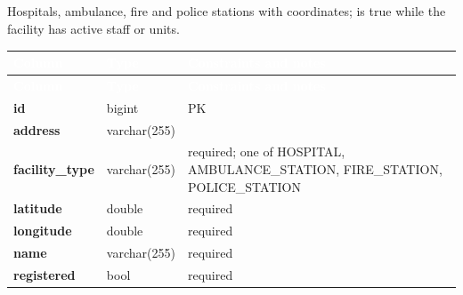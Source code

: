 \subsection*{}
Hospitals, ambulance, fire and police stations with coordinates;  is true while the facility has active staff or units.\par\vspace{2pt}
{\tabfont\rowband
\begin{longtable}{@{}>{\raggedright\arraybackslash}p{}>{\raggedright\arraybackslash}p{}>{\raggedright\arraybackslash}p{}@{}}
\rowcolor{najdanavy}\textcolor{white}{\sffamily\bfseries\small Column} & \textcolor{white}{\sffamily\bfseries\small Type} & \textcolor{white}{\sffamily\bfseries\small Constraints and notes}\\
\endfirsthead
\rowcolor{najdanavy}\textcolor{white}{\sffamily\bfseries\small Column} & \textcolor{white}{\sffamily\bfseries\small Type} & \textcolor{white}{\sffamily\bfseries\small Constraints and notes}\\
\endhead
\bottomrule\endlastfoot
\textbf{id} & bigint & PK\\
\textbf{address} & varchar(255) & \\
\textbf{facility\_\allowbreak{}type} & varchar(255) & required; one of HOSPITAL, AMBULANCE\_\allowbreak{}STATION, FIRE\_\allowbreak{}STATION, POLICE\_\allowbreak{}STATION\\
\textbf{latitude} & double & required\\
\textbf{longitude} & double & required\\
\textbf{name} & varchar(255) & required\\
\textbf{registered} & bool & required\\
\end{longtable}}

